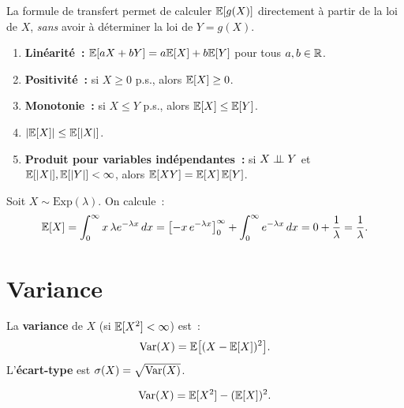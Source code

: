 \begin{intuition}[title=\textbf{Pourquoi LOTUS est si utile}]
La formule de transfert permet de calculer $\mathbb{E}[g(X)]$ directement \`a partir de la
loi de $X$, \emph{sans} avoir \`a d\'eterminer la loi de $Y = g(X)$.
\end{intuition}

\begin{theoreme}
\label{thm:prop_esperance}
\begin{enumerate}[label=(\roman*)]
    \item \textbf{Lin\'earit\'e~:} $\mathbb{E}[aX + bY] = a\mathbb{E}[X] + b\mathbb{E}[Y]$ pour tous
          $a, b \in \mathbb{R}$.
    \item \textbf{Positivit\'e~:} si $X \geq 0$ p.s., alors $\mathbb{E}[X] \geq 0$.
    \item \textbf{Monotonie~:} si $X \leq Y$ p.s., alors $\mathbb{E}[X] \leq \mathbb{E}[Y]$.
    \item $\left| \mathbb{E}[X] \right| \leq \mathbb{E}[\left| X \right|]$.
    \item \textbf{Produit pour variables ind\'ependantes~:}
          si $X \perp\!\!\!\perp Y$ et $\mathbb{E}[\left| X \right|], \mathbb{E}[\left| Y \right|] < \infty$, alors
          $\mathbb{E}[XY] = \mathbb{E}[X]\, \mathbb{E}[Y]$.
\end{enumerate}
\end{theoreme}

\begin{exemple}
Soit $X \sim \text{Exp}(\lambda)$. On calcule~:
\[
    \mathbb{E}[X] = \int_0^{\infty} x\, \lambda e^{-\lambda x}\, dx
    = \left[-x\, e^{-\lambda x}\right]_0^{\infty} + \int_0^{\infty} e^{-\lambda x}\, dx
    = 0 + \frac{1}{\lambda} = \frac{1}{\lambda}.
\]
\end{exemple}

\section{Variance}

\begin{definition}
La \textbf{variance} de $X$ (si $\mathbb{E}[X^2] < \infty$) est~:
\[
    \mathrm{Var}(X) = \mathbb{E}\bigl[(X - \mathbb{E}[X])^2\bigr].
\]
L'\textbf{\'ecart-type} est $\sigma(X) = \sqrt{\mathrm{Var}(X)}$.
\end{definition}

\begin{theoreme}
\label{thm:konig}
\[
    \mathrm{Var}(X) = \mathbb{E}[X^2] - (\mathbb{E}[X])^2.
\]
\end{theoreme}

